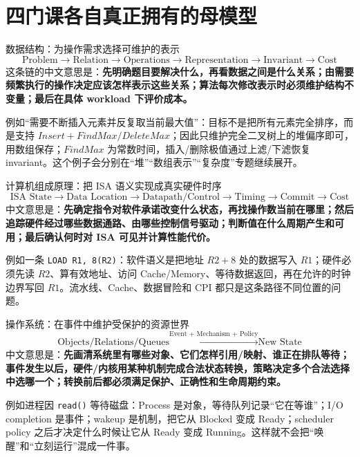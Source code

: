 \documentclass[11pt,a4paper,openany]{ctexbook}
\newcommand{\key}[1]{\textbf{\color{deep}#1}}
\begin{document}
\section{四门课各自真正拥有的母模型}

\begin{corebox}{数据结构：为操作需求选择可维护的表示}
\[
\boxed{\text{Problem}\rightarrow\text{Relation}\rightarrow\text{Operations}\rightarrow\text{Representation}\rightarrow\text{Invariant}\rightarrow\text{Cost}}
\]
这条链的中文意思是：\key{先明确题目要解决什么，再看数据之间是什么关系；由需要频繁执行的操作决定应该怎样表示这些关系；算法每次修改表示时必须维护结构不变量；最后在具体 workload 下评价成本。}
\end{corebox}

例如“需要不断插入元素并反复取当前最大值”：目标不是把所有元素完全排序，而是支持 $Insert+FindMax/DeleteMax$；因此只维护完全二叉树上的堆偏序即可，用数组保存；$FindMax$ 为常数时间，插入/删除极值通过上滤/下滤恢复 invariant。这个例子会分别在“堆”“数组表示”“复杂度”专题继续展开。

\begin{corebox}{计算机组成原理：把 ISA 语义实现成真实硬件时序}
\[
\boxed{\text{ISA State}\rightarrow\text{Data Location}\rightarrow\text{Datapath/Control}\rightarrow\text{Timing}\rightarrow\text{Commit}\rightarrow\text{Cost}}
\]
中文意思是：\key{先确定指令对软件承诺改变什么状态，再找操作数当前在哪里；然后追踪硬件经过哪些数据通路、由哪些控制信号驱动；判断值在什么周期产生和可用；最后确认何时对 ISA 可见并计算性能代价。}
\end{corebox}

例如一条 \texttt{LOAD R1, 8(R2)}：软件语义是把地址 $R2+8$ 处的数据写入 $R1$；硬件必须先读 $R2$、算有效地址、访问 Cache/Memory、等待数据返回，再在允许的时钟边界写回 $R1$。流水线、Cache、数据冒险和 CPI 都只是这条路径不同位置的问题。

\begin{corebox}{操作系统：在事件中维护受保护的资源世界}
\[
\boxed{\text{Objects/Relations/Queues}\xrightarrow{\text{Event + Mechanism + Policy}}\text{New State}}
\]
中文意思是：\key{先画清系统里有哪些对象、它们怎样引用/映射、谁正在排队等待；事件发生以后，硬件/内核用某种机制完成合法状态转换，策略决定多个合法选择中选哪一个；转换前后都必须满足保护、正确性和生命周期约束。}
\end{corebox}

例如进程因 \texttt{read()} 等待磁盘：Process 是对象，等待队列记录“它在等谁”；I/O completion 是事件；wakeup 是机制，把它从 Blocked 变成 Ready；scheduler policy 之后才决定什么时候让它从 Ready 变成 Running。这样就不会把“唤醒”和“立刻运行”混成一件事。
\end{document}
